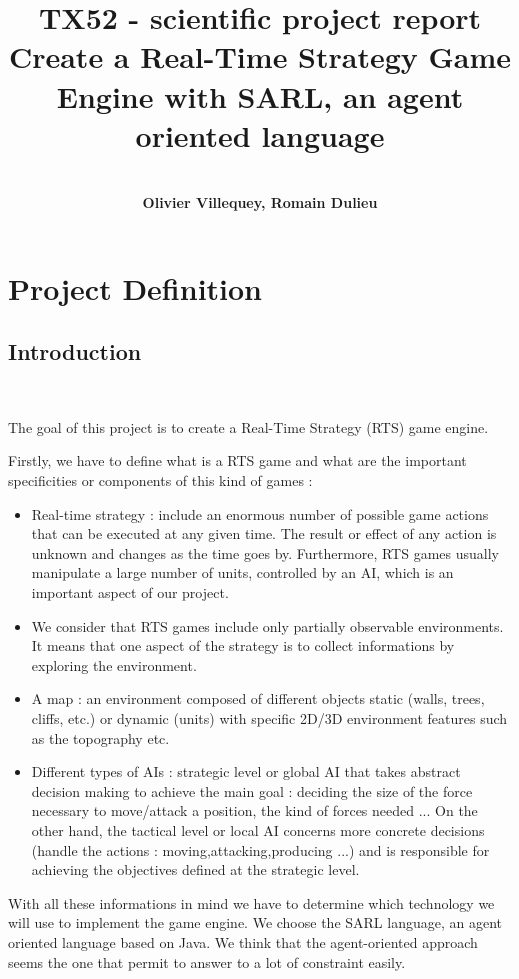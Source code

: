 \documentclass[a4paper,10pt]{book}
\title{\textbf{TX52 - scientific project report }\\
  Create a Real-Time Strategy Game Engine with SARL, an agent oriented language}
\author{~\\
  \textbf{Olivier Villequey, Romain Dulieu} }
\begin{document}
\maketitle

\tableofcontents

\chapter{Project Definition}

\section {Introduction}

~

The goal of this project is to create a Real-Time Strategy (RTS) game engine.

Firstly, we have to define what is a RTS game and what are the important specificities or components of this kind of games :
\begin{itemize}
 \item Real-time strategy : include an enormous number of possible game actions that can be executed at any given time. The result or effect of any action is unknown
  and changes as the time goes by. Furthermore, RTS games usually manipulate a large number of units, controlled by an AI, which is an important aspect of our project. 
 \item We consider that RTS games include only partially observable environments. It means that one aspect of the strategy is to collect informations by exploring the environment.
 \item A map : an environment composed of different objects static (walls, trees, cliffs, etc.) or dynamic (units) with specific 2D/3D environment features such as the topography etc.
 \item Different types of AIs : strategic level or global AI that takes abstract decision making to achieve the main goal : deciding the size of the force necessary to move/attack a position, the kind of forces needed ... 
  On the other hand, the tactical level or local AI concerns more concrete decisions (handle the actions : moving,attacking,producing ...) and is responsible for achieving the objectives defined at the strategic level.
\end{itemize}

With all these informations in mind we have to determine which technology we will use to  implement the game engine. We choose the SARL language, an agent oriented language based on Java. We think that the agent-oriented approach seems the one that permit to answer to a lot of constraint easily.
\end{document}
